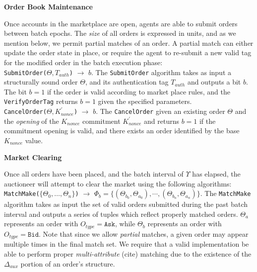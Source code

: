 \documentclass[10pt,a4paper]{article}
\theoremstyle{definition}
\begin{document}
\begin{center}
    \textbf{Order Book Maintenance}
\end{center}

Once accounts in the marketplace are open, agents are able to submit orders
between batch epochs. The \emph{size} of all orders is expressed in units, and
as we mention below, we permit partial matches of an order. A partial match can
either update the order state in place, or require the agent to re-submit a new
valid tag for the modified order in the batch execution phase: \\

\texttt{SubmitOrder($\Theta, T_{auth}$)} $\rightarrow$ $b$. The
\texttt{SubmitOrder} algorithm takes as input a structurally sound order
$\Theta$, and its authentication tag $T_{auth}$ and outputs a bit $b$. The bit
$b=1$ if the order is valid according to market place rules, and the
\texttt{VerifyOrderTag} returns $b=1$ given the specified parameters. \\

\texttt{CancelOrder($\Theta, K_{nonce}^\prime$)} $\rightarrow$ $b$. The
\texttt{CancelOrder} given an existing order $\Theta$ and the \emph{opening} of
the $K_{nonce}$ commitment $K_{nonce}^\prime$ and returns $b=1$ if the
commitment opening is valid, and there exists an order identified by the base
$K_{nonce}$ value.

\begin{center}
    \textbf{Market Clearing}
\end{center}

Once all orders have been placed, and the batch interval of $\Upsilon$ has
elapsed, the auctioneer will attempt to clear the market using the following
algorithms: \\

\texttt{MatchMake($\{\Theta_0, \ldots, \Theta_n\}$)} $\rightarrow$
$\Phi_b = \{(\Theta_{b_0}, \Theta_{a_0}), \cdots, (\Theta_{b_n}, \Theta_{a_n})\}$. The
\texttt{MatchMake} algorithm takes as input the set of valid orders submitted
during the past batch interval and outputs a series of tuples which reflect
properly matched orders. $\Theta_a$ represents an order with $O_{type} =
\texttt{Ask}$, while $\Theta_b$ represents an order with $O_{type} =
\texttt{Bid}$. Note that since we allow \emph{partial} matches, a given order
may appear multiple times in the final match set. We require that a valid
implementation be able to perform proper \emph{multi-attribute} (cite) matching
due to the existence of the $\Delta_{aux}$ portion of an order's structure. \\
\end{document}
